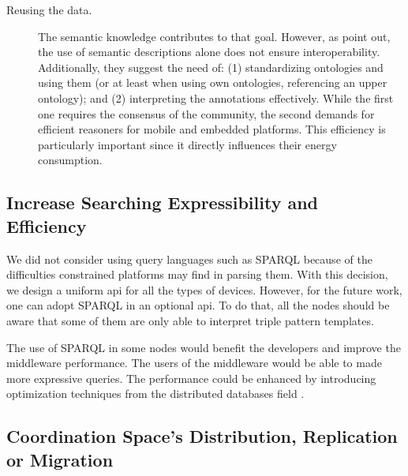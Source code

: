 \begin{description}
  \item[Reusing the data.] The semantic knowledge contributes to that goal.
			  However, as \citet{barnaghi_semantics_2012} point out, the use of semantic descriptions alone does not ensure interoperability.
			  Additionally, they suggest the need of:
			  (1) standardizing ontologies and using them (or at least when using own ontologies, referencing an upper ontology); and
			  (2) interpreting the annotations effectively. %
			  While the first one requires the consensus of the community, the second demands for efficient reasoners for mobile and embedded platforms.
			  This efficiency is particularly important since it directly influences their energy consumption.
			  
\end{description}


\subsection{Increase Searching Expressibility and Efficiency}

We did not consider using query languages such as SPARQL because of the difficulties constrained platforms may find in parsing them.
With this decision, we design a uniform \ac{api} for all the types of devices.
However, for the future work, one can adopt SPARQL in an optional \ac{api}.
To do that, all the nodes should be aware that some of them are only able to interpret triple pattern templates.

The use of SPARQL in some nodes would benefit the developers and improve the middleware performance. %
The users of the middleware would be able to made more expressive queries.
The performance could be enhanced by introducing optimization techniques from the distributed databases field \cite{schwarte_fedx_optimization_2011}. %


\subsection{Coordination Space's Distribution, Replication or Migration} %

